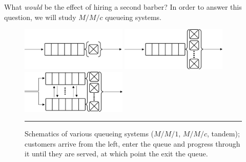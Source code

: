 \noindent What \textit{would} be the effect of hiring a second barber? In order to answer this question, we will study $M/M/c$ queueing systems.   
\begin{figure}[!t]
\centering
\includegraphics[width=0.45\textwidth]{Images/MM12.png}\qquad\qquad 
\includegraphics[width=0.45\textwidth]{Images/MMc.png}\\
\includegraphics[width=0.45\textwidth]{Images/Tandem.png}
\caption{\small Schematics of various queueing systems ($M/M/1$, $M/M/c$, tandem); customers arrive from the left, enter the queue and progress through it until they are served, at which point the exit the queue.}\label{fig:MM}\hrule
\end{figure}\afterpage{\FloatBarrier}
